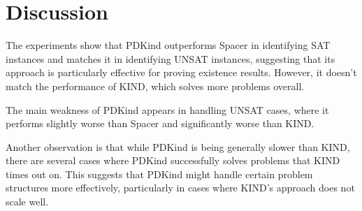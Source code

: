 \section{Discussion}
\noindent \noindent The experiments show that PDKind outperforms Spacer in identifying SAT instances and matches it in identifying UNSAT instances, suggesting that its approach is particularly effective for proving existence results. However, it doesn't match the performance of KIND, which solves more problems overall.

The main weakness of PDKind appears in handling UNSAT cases, where it performs slightly worse than Spacer and significantly worse than KIND.

Another observation is that while PDKind is being generally slower than KIND, there are several cases where PDKind successfully solves problems that KIND times out on. This suggests that PDKind might handle certain problem structures more effectively, particularly in cases where KIND's approach does not scale well.
